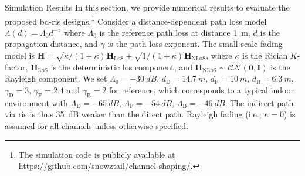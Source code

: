 \documentclass[journal]{IEEEtran}
\begin{document}
\begin{section}{Simulation Results}\label{sc:simulation}
	In this section, we provide numerical results to evaluate the proposed \gls{bd}-\gls{ris} designs.\footnote{The simulation code is publicly available at \url{https://github.com/snowztail/channel-shaping/}.}
	Consider a distance-dependent path loss model $\Lambda(d) = \Lambda_0 d^{-\gamma}$ where $\Lambda_0$ is the reference path loss at distance \qty{1}{m}, $d$ is the propagation distance, and $\gamma$ is the path loss exponent.
	The small-scale fading model is $\mathbf{H} = \sqrt{\kappa/(1+\kappa)} \mathbf{H}_\text{LoS} + \sqrt{1/(1+\kappa)} \mathbf{H}_\text{NLoS}$, where $\kappa$ is the Rician $K$-factor, $\mathbf{H}_\text{LoS}$ is the deterministic \gls{los} component, and $\mathbf{H}_\text{NLoS} \sim \mathcal{CN}(\mathbf{0}, \mathbf{I})$ is the Rayleigh component.
	We set $\Lambda_0=\qty{-30}{dB}$, $d_\mathrm{D}=\qty{14.7}{m}$, $d_\mathrm{F}=\qty{10}{m}$, $d_\mathrm{B}=\qty{6.3}{m}$, $\gamma_\mathrm{D}=3$, $\gamma_\mathrm{F}=2.4$ and $\gamma_\mathrm{B}=2$ for reference, which corresponds to a typical indoor environment with $\Lambda_\mathrm{D}=\qty{-65}{dB}$, $\Lambda_\mathrm{F}=\qty{-54}{dB}$, $\Lambda_\mathrm{B}=\qty{-46}{dB}$.
	The indirect path via \gls{ris} is thus \qty{35}{\dB} weaker than the direct path.
	Rayleigh fading (i.e., $\kappa = 0$) is assumed for all channels unless otherwise specified.


\end{section}
\end{document}
